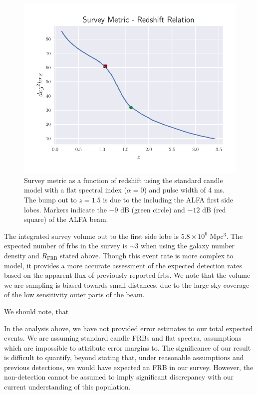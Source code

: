 \documentclass[a4paper,fleqn,usenatbib]{mnras}
\begin{document}
\begin{figure}
    \includegraphics[width=1.0\linewidth]{figures/full_sefd_z_relation.pdf}
    \caption{Survey metric as a function of redshift using the standard candle
    model with a flat spectral index ($\alpha=0$) and pulse width of 4 ms. The
    bump out to $z=1.5$ is due to the including the ALFA first side lobes.
    Markers indicate the $-9$ dB (green circle) and $-12$ dB (red square) of the
    ALFA beam.
    }
    \label{fig:full_sefd_z}
\end{figure}

The integrated survey volume out to the first side lobe is $5.8 \times
10^6$ Mpc$^3$. The expected number of \glspl{frb} in the survey is
$\sim 3$ when using the galaxy number density and $R_{\textrm{FRB}}$
stated above. Though this event rate is more complex to model, it
provides a more accurate assessment of the expected detection rates
based on the apparent flux of previously reported \glspl{frb}. We note
that the volume we are sampling is biased towards small distances, due
to the large sky coverage of the low sensitivity outer parts of the
beam.


We should note, that 




In the analysis above, we have not provided error estimates to our
total expected events. We are assuming standard candle FRBs and flat
spectra, assumptions which are impossible to attribute error margins
to. The significance of our result is difficult to quantify, beyond
stating that, under reasonable assumptions and previous detections, we
would have expected an FRB in our survey. However, the non-detection
cannot be assumed to imply significant discrepancy with our current
understanding of this population.
\end{document}
